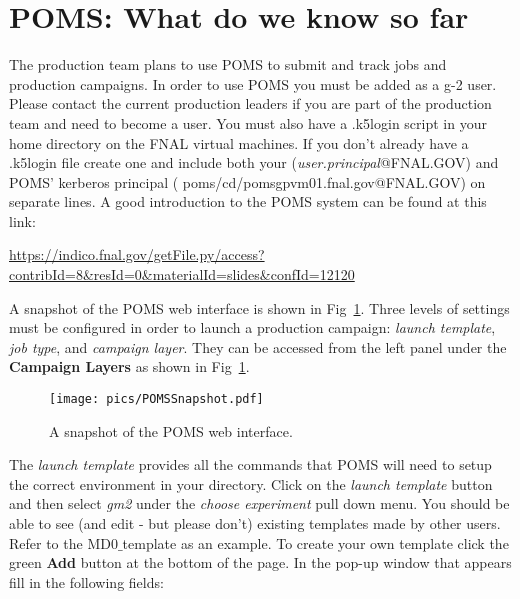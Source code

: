\section{POMS: What do we know so far}

The production team plans to use POMS to submit and track jobs and production campaigns. In order to use POMS you must be added  as a g-2 user.  Please contact the current production leaders if you are part of the production team and need to become a user.  You must also have a .k5login script in your home directory on the FNAL virtual machines. If you don't already have a .k5login file create one and include both your ({\it{user.principal}}@FNAL.GOV) and POMS' kerberos principal ( poms/cd/pomsgpvm01.fnal.gov@FNAL.GOV) on separate lines.  A good introduction to the POMS system  can be found at this link:

\begin{center}
{\footnotesize
\url{https://indico.fnal.gov/getFile.py/access?contribId=8&resId=0&materialId=slides&confId=12120}}
\end{center}

\noindent A snapshot of the POMS web interface is shown in Fig~\ref{fig:POMSSnapshot}. Three levels of settings must be configured in order to launch a production campaign: {\it{launch template}}, {\it{job type}}, and {\it{campaign layer}}. They can be accessed from the left panel under the \textbf{Campaign Layers} as shown in Fig~\ref{fig:POMSSnapshot}.\\

\begin{figure}[htbp]
\centering
\texttt{[image: pics/POMSSnapshot.pdf]} 
\caption{A snapshot of the POMS web interface.}\label{fig:POMSSnapshot}
\end{figure}

\noindent The {\it{launch template}} provides all the commands that POMS will need to setup the correct environment in your directory. Click on the {\it{launch template} }button and then select {\it{gm2}} under the {\it{choose experiment}} pull down menu. You should be able to see (and edit - but please don't) existing templates made by other users.  Refer to the MD0$\_$template as an example. To create your own template click the green {\bf{Add}} button at the bottom of the page. In the pop-up window that appears fill in the following fields:

